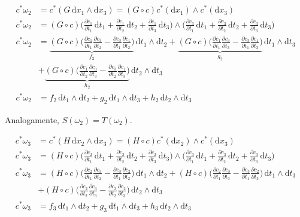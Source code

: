 \documentclass[12pt,a4paper]{article}
\begin{document}
		\begin{align}
			c^*\omega_2 &= c^*(G \,\mathrm{d}x_1 \wedge\mathrm{d}x_3) = (G \circ c) c^*(\mathrm{d}x_1) \wedge c^*(\mathrm{d}x_3) \\
			c^*\omega_2 &= (G \circ c) \biggl(\frac{\partial c_1}{\partial t_1} \,\mathrm{d}t_1 + \frac{\partial c_1}{\partial t_2} \,\mathrm{d}t_2 + \frac{\partial c_1}{\partial t_3} \,\mathrm{d}t_3 \biggl)
				\wedge \biggl(\frac{\partial c_3}{\partial t_1} \,\mathrm{d}t_1 + \frac{\partial c_3}{\partial t_2} \,\mathrm{d}t_2 + \frac{\partial c_3}{\partial t_3} \,\mathrm{d}t_3 \biggl) \\
			c^*\omega_2 &= \underbrace{(G \circ c) \biggl(\frac{\partial c_1}{\partial t_1} \frac{\partial c_3}{\partial t_2} - \frac{\partial c_3}{\partial t_1} \frac{\partial c_1}{\partial t_2} \biggl)}_\text{$f_2$} \,\mathrm{d}t_1 \wedge \mathrm{d}t_2
				+ \underbrace{(G \circ c) \biggl(\frac{\partial c_1}{\partial t_1} \frac{\partial c_3}{\partial t_3} - \frac{\partial c_3}{\partial t_1} \frac{\partial c_1}{\partial t_3} \biggl)}_\text{$g_2$} \,\mathrm{d}t_1 \wedge \mathrm{d}t_3 \\
				&+ \underbrace{(G \circ c) \biggl(\frac{\partial c_1}{\partial t_2} \frac{\partial c_3}{\partial t_3} - \frac{\partial c_3}{\partial t_2} \frac{\partial c_1}{\partial t_3} \biggl)}_\text{$h_2$} \,\mathrm{d}t_2 \wedge \mathrm{d}t_3 \\
			c^*\omega_2 &= f_2 \,\mathrm{d}t_1 \wedge \mathrm{d}t_2 + g_2 \,\mathrm{d}t_1 \wedge \mathrm{d}t_3 + h_2 \,\mathrm{d}t_2 \wedge \mathrm{d}t_3
		\end{align}

		Analogamente, $S(\omega_2) = T(\omega_2)$.

		\begin{align}
			c^*\omega_3 &= c^*(H \,\mathrm{d}x_2 \wedge\mathrm{d}x_3) = (H \circ c) c^*(\mathrm{d}x_2) \wedge c^*(\mathrm{d}x_3) \\
			c^*\omega_3 &= (H \circ c) \biggl(\frac{\partial c_2}{\partial t_1} \,\mathrm{d}t_1 + \frac{\partial c_2}{\partial t_2} \,\mathrm{d}t_2 + \frac{\partial c_2}{\partial t_3} \,\mathrm{d}t_3 \biggl)
				\wedge \biggl(\frac{\partial c_3}{\partial t_1} \,\mathrm{d}t_1 + \frac{\partial c_3}{\partial t_2} \,\mathrm{d}t_2 + \frac{\partial c_3}{\partial t_3} \,\mathrm{d}t_3 \biggl) \\
			c^*\omega_3 &= (H \circ c) \biggl(\frac{\partial c_2}{\partial t_1} \frac{\partial c_3}{\partial t_2} - \frac{\partial c_3}{\partial t_1} \frac{\partial c_2}{\partial t_2} \biggl) \,\mathrm{d}t_1 \wedge \mathrm{d}t_2
				+ (H \circ c) \biggl(\frac{\partial c_2}{\partial t_1} \frac{\partial c_3}{\partial t_3} - \frac{\partial c_3}{\partial t_1} \frac{\partial c_2}{\partial t_3} \biggl) \,\mathrm{d}t_1 \wedge \mathrm{d}t_3 \\
				&+ (H \circ c) \biggl(\frac{\partial c_2}{\partial t_2} \frac{\partial c_3}{\partial t_3} - \frac{\partial c_3}{\partial t_2} \frac{\partial c_2}{\partial t_3} \biggl) \,\mathrm{d}t_2 \wedge \mathrm{d}t_3 \\
			c^*\omega_3 &= f_3 \,\mathrm{d}t_1 \wedge \mathrm{d}t_2 + g_3 \,\mathrm{d}t_1 \wedge \mathrm{d}t_3 + h_3 \,\mathrm{d}t_2 \wedge \mathrm{d}t_3
		\end{align}
\end{document}

